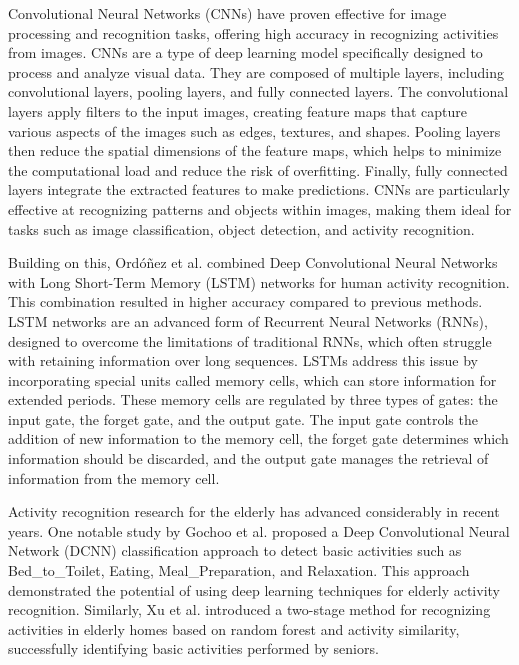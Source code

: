 Convolutional Neural Networks (CNNs) have proven effective for image processing and recognition tasks, offering high accuracy in recognizing activities from images. CNNs are a type of deep learning model specifically designed to process and analyze visual data. They are composed of multiple layers, including convolutional layers, pooling layers, and fully connected layers. The convolutional layers apply filters to the input images, creating feature maps that capture various aspects of the images such as edges, textures, and shapes. Pooling layers then reduce the spatial dimensions of the feature maps, which helps to minimize the computational load and reduce the risk of overfitting. Finally, fully connected layers integrate the extracted features to make predictions. CNNs are particularly effective at recognizing patterns and objects within images, making them ideal for tasks such as image classification, object detection, and activity recognition.

Building on this, Ordóñez et al. \cite{elderly3} combined Deep Convolutional Neural Networks with Long Short-Term Memory (LSTM) networks for human activity recognition. This combination resulted in higher accuracy compared to previous methods. LSTM networks are an advanced form of Recurrent Neural Networks (RNNs), designed to overcome the limitations of traditional RNNs, which often struggle with retaining information over long sequences. LSTMs address this issue by incorporating special units called memory cells, which can store information for extended periods. These memory cells are regulated by three types of gates: the input gate, the forget gate, and the output gate. The input gate controls the addition of new information to the memory cell, the forget gate determines which information should be discarded, and the output gate manages the retrieval of information from the memory cell.

Activity recognition research for the elderly has advanced considerably in recent years. One notable study by Gochoo et al. \cite{elderly2} proposed a Deep Convolutional Neural Network (DCNN) classification approach to detect basic activities such as Bed\_to\_Toilet, Eating, Meal\_Preparation, and Relaxation. This approach demonstrated the potential of using deep learning techniques for elderly activity recognition. Similarly, Xu et al. \cite{elderly1} introduced a two-stage method for recognizing activities in elderly homes based on random forest and activity similarity, successfully identifying basic activities performed by seniors.

